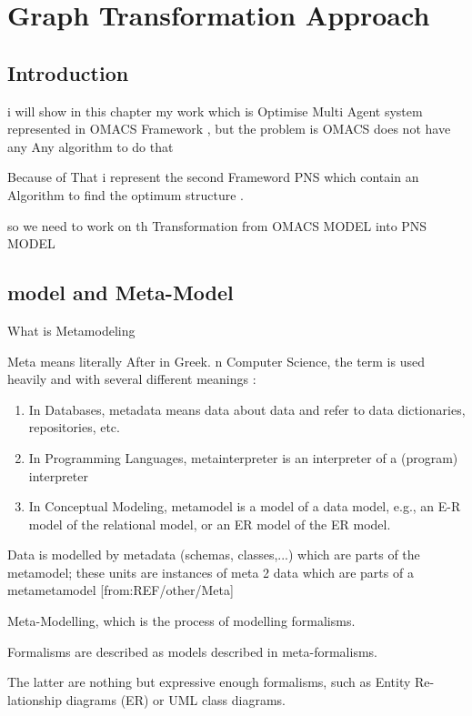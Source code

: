 
\chapter{\label{cha: Graph Transformation Approach }Graph Transformation Approach}

\section{ Introduction }
i will show in this chapter my work which is Optimise Multi Agent system  
represented in OMACS Framework , but the problem is OMACS does not have any 
Any algorithm to do that 

Because of That i represent the second Frameword PNS which contain an Algorithm 
to find the optimum structure .

so we need to work on th Transformation from OMACS MODEL into PNS MODEL



 
\section{model and Meta-Model }
What is Metamodeling 

Meta \quad means literally After in Greek.
n Computer Science, the term is used heavily and with
several different meanings : 
\begin{enumerate}
\item In Databases, metadata means  data about data  and
		refer to data dictionaries, repositories, etc.
\item In Programming Languages, metainterpreter is an
		interpreter of a (program) interpreter
\item In Conceptual Modeling, metamodel is a model of a
		data model, e.g., an E-R model of the relational model,
		or an ER model of the ER model.
		
\end{enumerate}
 
Data is modelled by metadata (schemas,  classes,...)
which are parts of the metamodel; these units are
instances of meta 2 data which are parts of a
metametamodel
[from:REF/other/Meta]



Meta-Modelling, which is the process of modelling formalisms. 

Formalisms are described as models described in meta-formalisms. 

The latter are nothing  
but expressive enough formalisms, such as Entity Re-
lationship diagrams (ER) or UML class diagrams.

